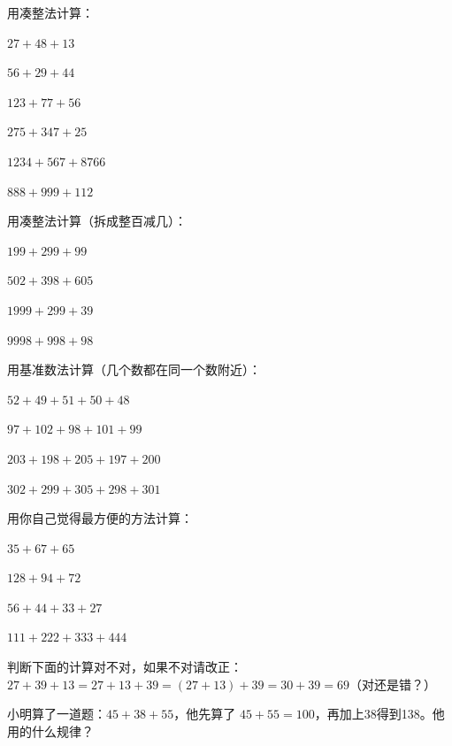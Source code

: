 \begin{exercise}
\item 用凑整法计算：
  \begin{subexercise}
    \item $27+48+13$
    \item $56+29+44$
    \item $123+77+56$
    \item $275+347+25$
    \item $1234+567+8766$
    \item $888+999+112$
  \end{subexercise}

\item 用凑整法计算（拆成整百减几）：
  \begin{subexercise}
    \item $199+299+99$
    \item $502+398+605$
    \item $1999+299+39$
    \item $9998+998+98$
  \end{subexercise}

\item 用基准数法计算（几个数都在同一个数附近）：
  \begin{subexercise}
    \item $52+49+51+50+48$
    \item $97+102+98+101+99$
    \item $203+198+205+197+200$
    \item $302+299+305+298+301$
  \end{subexercise}

\item 用你自己觉得最方便的方法计算：
  \begin{subexercise}
    \item $35+67+65$
    \item $128+94+72$
    \item $56+44+33+27$
    \item $111+222+333+444$
  \end{subexercise}

\item 判断下面的计算对不对，如果不对请改正：
  $27+39+13 = 27+13+39 = (27+13)+39 = 30+39 = 69$（对还是错？）

\item 小明算了一道题：$45+38+55$，他先算了 $45+55=100$，再加上38得到138。他用的什么规律？
\end{exercise}



